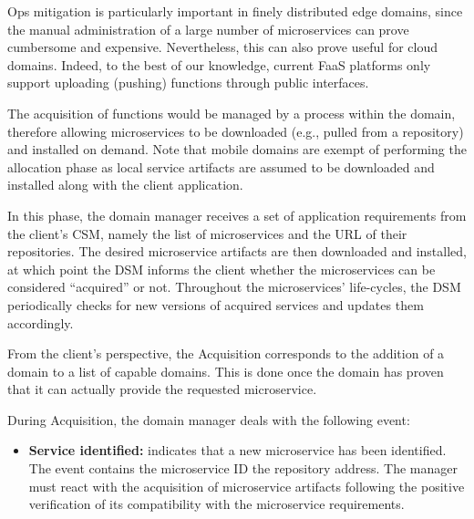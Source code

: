 
Ops mitigation is particularly important in finely distributed edge domains, since the manual administration of a large number of microservices can prove cumbersome and expensive. Nevertheless, this can also prove useful for cloud domains. Indeed, to the best of our knowledge, current FaaS platforms only support uploading (pushing) functions through public interfaces. 

The acquisition of functions would be managed by a process within the domain, therefore allowing microservices to be downloaded (e.g., pulled from a repository) and installed on demand. Note that mobile domains are exempt of performing the allocation phase as local service artifacts are assumed to be downloaded and installed along with the client application.


In this phase, the domain manager receives a set of application requirements from the client's CSM, namely the list of microservices and the URL of their repositories. The desired microservice artifacts are then downloaded and installed, at which point the DSM informs the client whether the microservices can be considered ``acquired'' or not. 
Throughout the microservices' life-cycles, the DSM periodically checks for new versions of acquired services and updates them accordingly. 

From the client's perspective, the Acquisition corresponds to the addition of a domain to a list of capable domains. This is done once the domain has proven that it can actually provide the requested microservice. 

During Acquisition, the domain manager deals with the following event:

\begin{itemize}
	
	\item \textbf{Service identified:} indicates that a new microservice has been identified. The event contains the microservice ID  the repository address. The manager must react with the acquisition of microservice artifacts following the positive verification of its compatibility with the microservice requirements.
	
\end{itemize}

